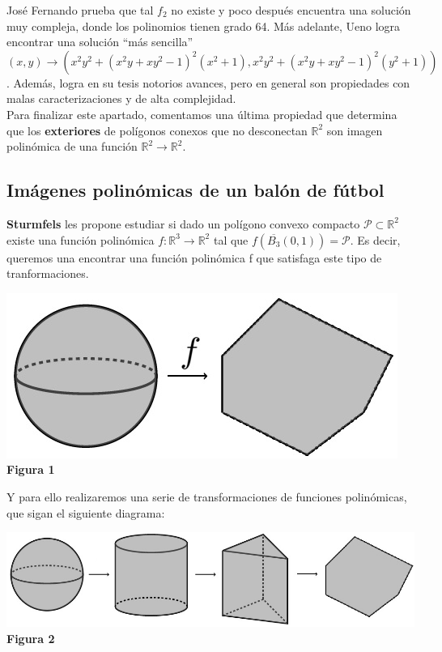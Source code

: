\documentclass[11pt]{article}
\theoremstyle{definition} %
\newcommand{\R}{\mathbb{R}}
\newcommand{\function}[3]{#1\colon #2\to #3}
\begin{document}
José Fernando prueba que tal $f_2$ no existe y poco después encuentra una solución muy compleja, donde los polinomios tienen grado 64. Más adelante, Ueno logra encontrar una solución ``más sencilla'' $(x,y)\to(x^2y^2+(x^2y+xy^2-1)^2(x^2+1),x^2y^2+(x^2y+xy^2-1)^2(y^2+1))$. Además, logra en su tesis notorios avances, pero en general son propiedades con malas caracterizaciones y de alta complejidad.\\

Para finalizar este apartado, comentamos una última propiedad que determina que los \textbf{exteriores} de polígonos conexos que no desconectan $\R^2$ son imagen polinómica de una función $\R^2\to\R^2$.

\subsection{Imágenes polinómicas de un balón de fútbol}

\textbf{Sturmfels} les propone estudiar si dado un polígono convexo compacto $\mathcal{P}\subset\R^2$ existe una función polinómica $\function{f}{\R^3}{\R^2}$ tal que $f(\overline{B_3}(0,1))=\mathcal{P}$. Es decir, queremos una encontrar una función polinómica f que satisfaga este tipo de tranformaciones.
\begin{center}
\includegraphics[scale=0.4]{1}\\\textbf{Figura 1}
\end{center}
Y para ello realizaremos una serie de transformaciones de funciones polinómicas, que sigan el siguiente diagrama:
\begin{center}
\includegraphics[scale=0.4]{2}\\\textbf{Figura 2}
\end{center}
\end{document}
